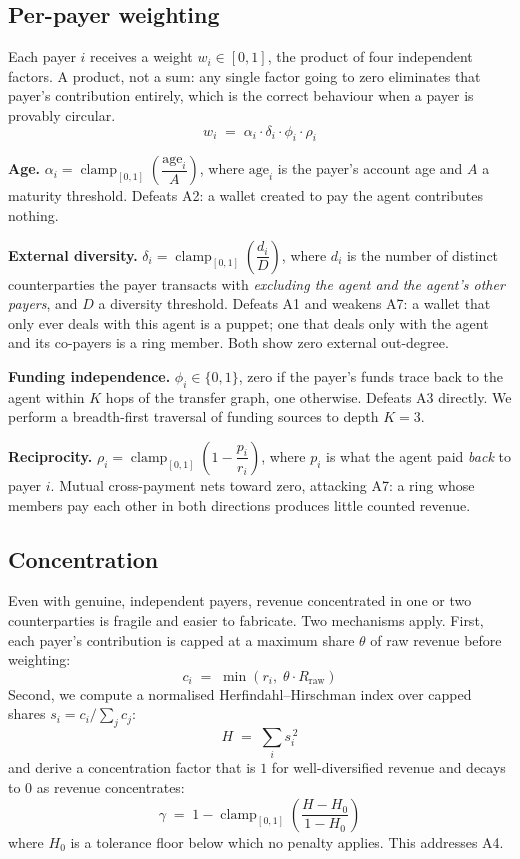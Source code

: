 \documentclass[11pt,a4paper]{article}
\DeclareMathOperator{\clampop}{clamp}
\newcommand{\clamp}[1]{\clampop_{[0,1]}\!\left(#1\right)}
\begin{document}
\subsection{Per-payer weighting}

Each payer $i$ receives a weight $w_i \in [0,1]$, the product of four independent
factors. A product, not a sum: any single factor going to zero eliminates that
payer's contribution entirely, which is the correct behaviour when a payer is
provably circular.
\begin{equation}
w_i \;=\; \alpha_i \cdot \delta_i \cdot \phi_i \cdot \rho_i
\end{equation}

\textbf{Age.} $\alpha_i = \clamp{\dfrac{\mathrm{age}_i}{A}}$, where
$\mathrm{age}_i$ is the payer's account age and $A$ a maturity threshold.
Defeats A2: a wallet created to pay the agent contributes nothing.

\textbf{External diversity.} $\delta_i = \clamp{\dfrac{d_i}{D}}$, where $d_i$ is
the number of distinct counterparties the payer transacts with \emph{excluding
the agent and the agent's other payers}, and $D$ a diversity threshold. Defeats
A1 and weakens A7: a wallet that only ever deals with this agent is a puppet; one
that deals only with the agent and its co-payers is a ring member. Both show zero
external out-degree.

\textbf{Funding independence.} $\phi_i \in \{0,1\}$, zero if the payer's funds
trace back to the agent within $K$ hops of the transfer graph, one otherwise.
Defeats A3 directly. We perform a breadth-first traversal of funding sources to
depth $K = 3$.

\textbf{Reciprocity.} $\rho_i = \clamp{1 - \dfrac{p_i}{r_i}}$, where $p_i$ is
what the agent paid \emph{back} to payer $i$. Mutual cross-payment nets toward
zero, attacking A7: a ring whose members pay each other in both directions
produces little counted revenue.

\subsection{Concentration}

Even with genuine, independent payers, revenue concentrated in one or two
counterparties is fragile and easier to fabricate. Two mechanisms apply. First,
each payer's contribution is capped at a maximum share $\theta$ of raw revenue
before weighting:
\begin{equation}
c_i \;=\; \min\!\left(r_i,\; \theta \cdot R_{\mathrm{raw}}\right)
\end{equation}
Second, we compute a normalised Herfindahl--Hirschman index over capped shares
$s_i = c_i / \sum_j c_j$:
\begin{equation}
H \;=\; \sum_i s_i^{\,2}
\end{equation}
and derive a concentration factor that is $1$ for well-diversified revenue and
decays to $0$ as revenue concentrates:
\begin{equation}
\gamma \;=\; 1 - \clamp{\frac{H - H_0}{1 - H_0}}
\end{equation}
where $H_0$ is a tolerance floor below which no penalty applies. This addresses
A4.
\end{document}
